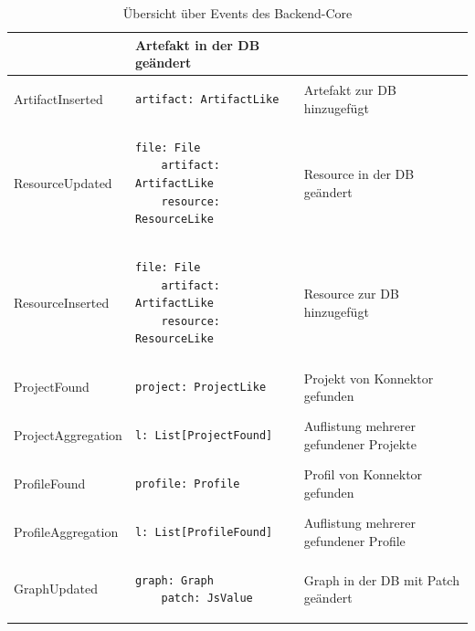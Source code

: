 \begin{table}
\begin{tabular}{|l|l|p{4.8cm}|}
\begin{lstlisting}[gobble=4]
    \end{lstlisting}                                                   & \gls{Artefakt} in der DB geändert                                \\ \hline
    ArtifactInserted    & \begin{lstlisting}[gobble=4]
    artifact: ArtifactLike    
    \end{lstlisting}                                               & \gls{Artefakt} zur DB hinzugefügt                                \\ \hline
    ResourceUpdated     & \begin{lstlisting}[gobble=4]
    file: File
    artifact: ArtifactLike
    resource: ResourceLike
    \end{lstlisting}               & Resource in der DB geändert                                \\ \hline
    ResourceInserted    & \begin{lstlisting}[gobble=4]
    file: File
    artifact: ArtifactLike
    resource: ResourceLike
    \end{lstlisting}               & Resource zur DB hinzugefügt                                \\ \hline
    ProjectFound        & \begin{lstlisting}[gobble=4]
    project: ProjectLike
    \end{lstlisting}                                                     & Projekt von \gls{Konnektor} gefunden                             \\ \hline
    ProjectAggregation  & \begin{lstlisting}[gobble=4]
    l: List[ProjectFound]      
    \end{lstlisting}                                               & Auflistung mehrerer gefundener Projekte                    \\ \hline
    ProfileFound        & \begin{lstlisting}[gobble=4]
    profile: Profile   
    \end{lstlisting}                                                       & Profil von \gls{Konnektor} gefunden                              \\ \hline
    ProfileAggregation  & \begin{lstlisting}[gobble=4]
    l: List[ProfileFound]  
    \end{lstlisting}                                                   & Auflistung mehrerer gefundener Profile                     \\ \hline
    GraphUpdated        & \begin{lstlisting}[gobble=4]
    graph: Graph
    patch: JsValue
    \end{lstlisting}                                             & Graph in der DB mit Patch geändert                         \\ \hline
    \end{tabular}
    \caption{Übersicht über Events des \gls{Backend}-Core}
    \label{tab:events}
\end{table}
